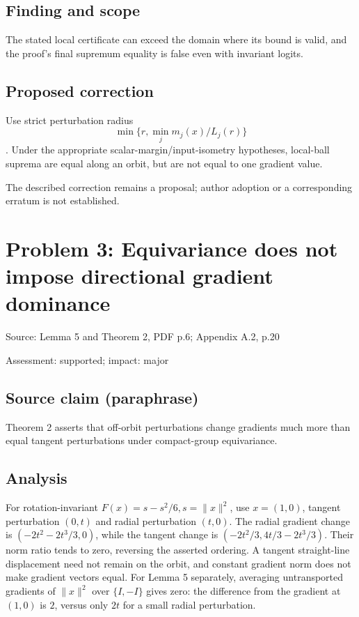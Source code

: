 \documentclass[11pt]{article}
\begin{document}
\subsection*{Finding and scope}

The stated local certificate can exceed the domain where its bound is valid, and the proof’s final supremum equality is false even with invariant logits.

\subsection*{Proposed correction}

Use strict perturbation radius \[\min\{r,\min_j m_j(x)/L_j(r)\}\]. Under the appropriate scalar-margin/input-isometry hypotheses, local-ball suprema are equal along an orbit, but are not equal to one gradient value.

The described correction remains a proposal; author adoption or a corresponding erratum is not established.

\section*{Problem 3: Equivariance does not impose directional gradient dominance}

Source: Lemma 5 and Theorem 2, PDF p.6; Appendix A.2, p.20

Assessment: supported; impact: major

\subsection*{Source claim (paraphrase)}

Theorem 2 asserts that off-orbit perturbations change gradients much more than equal tangent perturbations under compact-group equivariance.

\subsection*{Analysis}

For rotation-invariant \(F(x)=s-s^2/6,s=\|x\|^2\), use \(x=(1,0)\), tangent perturbation \((0,t)\) and radial perturbation \((t,0)\). The radial gradient change is \((-2t^2-2t^3/3,0)\), while the tangent change is \((-2t^2/3,4t/3-2t^3/3)\). Their norm ratio tends to zero, reversing the asserted ordering. A tangent straight-line displacement need not remain on the orbit, and constant gradient norm does not make gradient vectors equal. For Lemma 5 separately, averaging untransported gradients of \(\|x\|^2\) over \(\{I,-I\}\) gives zero: the difference from the gradient at \((1,0)\) is \(2\), versus only \(2t\) for a small radial perturbation.
\end{document}
